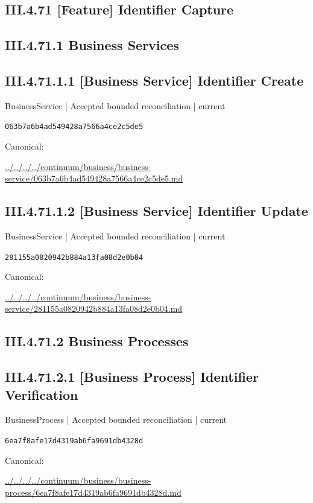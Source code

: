 \documentclass[10pt,a4paper]{article}
\begin{document}
\subsection*{III.4.71 [Feature] Identifier Capture}
\subsection*{III.4.71.1 Business Services}
\subsection*{III.4.71.1.1 [Business Service] Identifier Create}
{\small BusinessService | Accepted bounded reconciliation | current}\par
\texttt{063b7a6b4ad549428a7566a4ce2c5de5}\par
Canonical: \par
{\footnotesize\url{../../../../continuum/business/business-service/063b7a6b4ad549428a7566a4ce2c5de5.md}}\par
\subsection*{III.4.71.1.2 [Business Service] Identifier Update}
{\small BusinessService | Accepted bounded reconciliation | current}\par
\texttt{281155a0820942b884a13fa08d2e0b04}\par
Canonical: \par
{\footnotesize\url{../../../../continuum/business/business-service/281155a0820942b884a13fa08d2e0b04.md}}\par
\subsection*{III.4.71.2 Business Processes}
\subsection*{III.4.71.2.1 [Business Process] Identifier Verification}
{\small BusinessProcess | Accepted bounded reconciliation | current}\par
\texttt{6ea7f8afe17d4319ab6fa9691db4328d}\par
Canonical: \par
{\footnotesize\url{../../../../continuum/business/business-process/6ea7f8afe17d4319ab6fa9691db4328d.md}}\par
\end{document}
